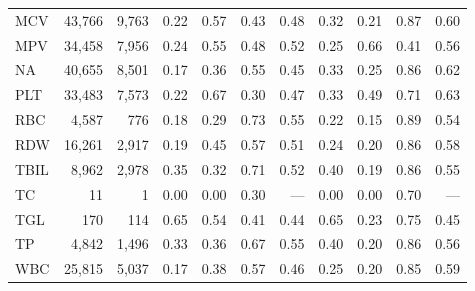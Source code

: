 \begin{table}[ht]
\begin{tabular}{lrrrrrrrrrr}
MCV & 43,766 & 9,763 & 0.22 & 0.57 & 0.43 & 0.48 & 0.32 & 0.21 & 0.87 & 0.60 \\
MPV & 34,458 & 7,956 & 0.24 & 0.55 & 0.48 & 0.52 & 0.25 & 0.66 & 0.41 & 0.56 \\
NA & 40,655 & 8,501 & 0.17 & 0.36 & 0.55 & 0.45 & 0.33 & 0.25 & 0.86 & 0.62 \\
PLT & 33,483 & 7,573 & 0.22 & 0.67 & 0.30 & 0.47 & 0.33 & 0.49 & 0.71 & 0.63 \\
RBC & 4,587 & 776 & 0.18 & 0.29 & 0.73 & 0.55 & 0.22 & 0.15 & 0.89 & 0.54 \\
RDW & 16,261 & 2,917 & 0.19 & 0.45 & 0.57 & 0.51 & 0.24 & 0.20 & 0.86 & 0.58 \\
TBIL & 8,962 & 2,978 & 0.35 & 0.32 & 0.71 & 0.52 & 0.40 & 0.19 & 0.86 & 0.55 \\
TC & 11 & 1 & 0.00 & 0.00 & 0.30 & --- & 0.00 & 0.00 & 0.70 & --- \\
TGL & 170 & 114 & 0.65 & 0.54 & 0.41 & 0.44 & 0.65 & 0.23 & 0.75 & 0.45 \\
TP & 4,842 & 1,496 & 0.33 & 0.36 & 0.67 & 0.55 & 0.40 & 0.20 & 0.86 & 0.56 \\
WBC & 25,815 & 5,037 & 0.17 & 0.38 & 0.57 & 0.46 & 0.25 & 0.20 & 0.85 & 0.59 \\
\bottomrule
\end{tabular}
\label{tab:12_eval_detail_eicu_prolonged_los}
\end{table}